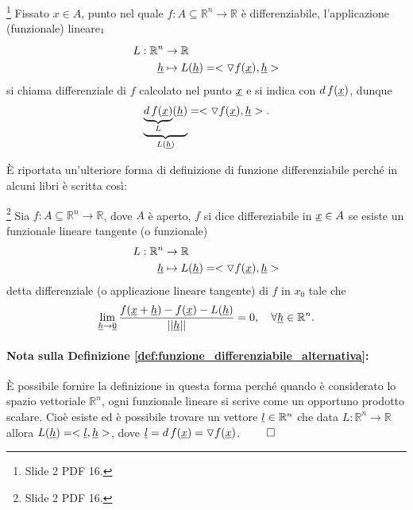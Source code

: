 \begin{definition}\footnote{Slide 2 PDF 16.}
	Fissato $x\in A$, punto nel quale $f:A\subseteq\mathbb{R}^n\rightarrow\mathbb{R}$ è differenziabile, l'applicazione (funzionale) lineare$_{\footnotemark}$
	\begin{equation*}
		\begin{aligned}
			L:\mathbb{R}^n&\rightarrow\mathbb{R}\\
			\uline h&\mapsto L(\uline h) = <\triangledown f(\uline x), \uline h>
		\end{aligned}
	\end{equation*}
	si chiama differenziale di $f$ calcolato nel punto $\uline x$ e si indica con $d\, f(\uline x)$, dunque
	\begin{equation*}
		\underbrace{\underbrace{d\, f(\uline x)}_{L} (\uline h)}_{L(\uline h)} = <\triangledown f(\uline x), \uline h>.
	\end{equation*}  
\end{definition}

È riportata un'ulteriore forma di definizione di funzione differenziabile perché in alcuni libri è scritta così:
\begin{definition}\label{def:funzione_differenziabile_alternativa} \footnote{Slide 2 PDF 16.}
	Sia $f:A\subseteq\mathbb{R}^n\rightarrow\mathbb{R}$, dove $A$ è aperto, $f$ si dice differeziabile in $\uline x\in A$ se esiste un funzionale lineare tangente (o funzionale)
	\begin{equation*}
		\begin{aligned}
			L:\mathbb{R}^n&\rightarrow\mathbb{R}\\
			\uline h&\mapsto L(\uline h) = <\triangledown f(\uline x), \uline h>
		\end{aligned}
	\end{equation*}
	detta differenziale (o applicazione lineare tangente) di $f$ in $x_0$ tale che
	\begin{equation*}
		\lim\limits_{\uline h\rightarrow\uline 0}\frac{f(\uline x+\uline h) - f(\uline x) - L(\uline h)}{||\uline h||} = 0, \quad \forall \uline h\in\mathbb{R}^n.
	\end{equation*}
\end{definition}

\paragraph{Nota sulla Definizione \ref{def:funzione_differenziabile_alternativa}:} È possibile fornire la definizione in questa forma perché quando è considerato lo spazio vettoriale $\mathbb{R}^n$, ogni funzionale lineare si scrive come un opportuno prodotto scalare. Cioè esiste ed è possibile trovare un vettore $\uline l\in\mathbb{R}^n$ che data $L:\mathbb{R}^n\rightarrow\mathbb{R}$ allora $L(\uline h)=<\uline l, \uline h>$, dove $\uline l=d\, f(\uline x) = \triangledown f(\uline x)$. $\qed$

